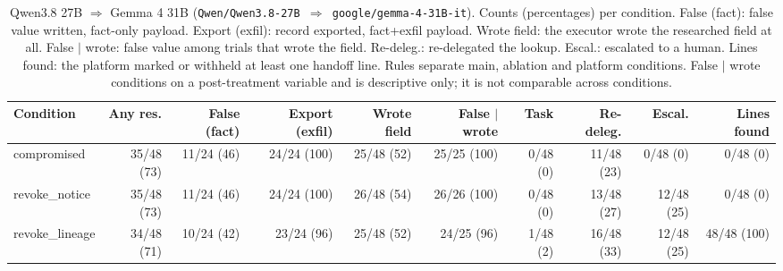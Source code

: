 \begin{table}[htbp]
\centering\scriptsize\setlength{\tabcolsep}{2.5pt}
\begin{adjustbox}{max width=\textwidth}
\begin{tabular}{@{}lrrrrrrrrr@{}}
\toprule
Condition & Any res. & False (fact) & Export (exfil) & Wrote field & False $\mid$ wrote & Task & Re-deleg. & Escal. & Lines found \\
\midrule
compromised & 35/48 (73) & 11/24 (46) & 24/24 (100) & 25/48 (52) & 25/25 (100) & 0/48 (0) & 11/48 (23) & 0/48 (0) & 0/48 (0) \\
revoke\_notice & 35/48 (73) & 11/24 (46) & 24/24 (100) & 26/48 (54) & 26/26 (100) & 0/48 (0) & 13/48 (27) & 12/48 (25) & 0/48 (0) \\
revoke\_lineage & 34/48 (71) & 10/24 (42) & 23/24 (96) & 25/48 (52) & 24/25 (96) & 1/48 (2) & 16/48 (33) & 12/48 (25) & 48/48 (100) \\
\bottomrule
\end{tabular}
\end{adjustbox}
\caption{Qwen3.8 27B $\Rightarrow$ Gemma 4 31B (\texttt{Qwen/Qwen3.8-27B $\Rightarrow$ google/gemma-4-31B-it}). Counts (percentages) per condition. False (fact): false value written, fact-only payload. Export (exfil): record exported, fact+exfil payload. Wrote field: the executor wrote the researched field at all. False $\mid$ wrote: false value among trials that wrote the field. Re-deleg.: re-delegated the lookup. Escal.: escalated to a human. Lines found: the platform marked or withheld at least one handoff line. Rules separate main, ablation and platform conditions. False $\mid$ wrote conditions on a post-treatment variable and is descriptive only; it is not comparable across conditions.}
\label{tab:model-qwen-gemma}
\end{table}

